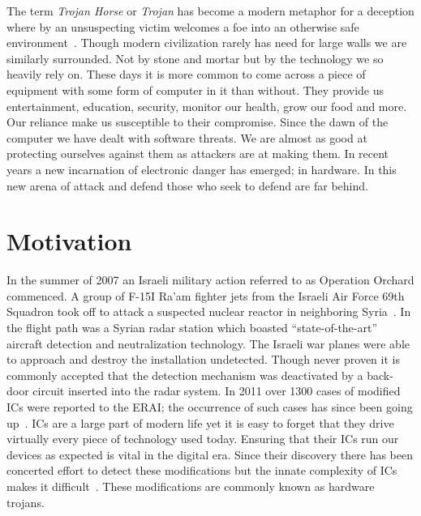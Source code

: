 \label{chapter:introduction}
The term \textit{Trojan Horse} or \textit{Trojan} has become a modern metaphor for a deception where by an unsuspecting victim welcomes a foe into an otherwise safe environment~\cite{searchForTrojanWar}.
Though modern civilization rarely has need for large walls we are similarly surrounded.
Not by stone and mortar but by the technology we so heavily rely on.
These days it is more common to come across a piece of equipment with some form of computer in it than without.
They provide us entertainment, education, security, monitor our health, grow our food and more.
Our reliance make us susceptible to their compromise.
Since the dawn of the computer we have dealt with software threats.
We are almost as good at protecting ourselves against them as attackers are at making them.
In recent years a new incarnation of electronic danger has emerged; in hardware.
In this new arena of attack and defend those who seek to defend are far behind.

\section{Motivation}
In the summer of 2007 an Israeli military action referred to as Operation Orchard commenced.
A group of F-15I Ra'am fighter jets from the Israeli Air Force 69th Squadron took off to attack a suspected nuclear reactor in neighboring Syria~\cite{stoppingHTsIEEESpectrum}.
In the flight path was a Syrian radar station which boasted ``state-of-the-art'' aircraft detection and neutralization technology. 
The Israeli war planes were able to approach and destroy the installation undetected.
Though never proven it is commonly accepted that the detection mechanism was deactivated by a back-door circuit inserted into the radar system.
In 2011 over 1300 cases of modified \acrshort{IC}s were reported to the \acrfull{ERAI}; the occurrence of such cases has since been going up~\cite{counterfeitIEEESpectrum}.
\acrfull{ICs} are a large part of modern life yet it is easy to forget that they drive virtually every piece of technology used today.
Ensuring that their \acrshort{IC}s run our devices as expected is vital in the digital era.
Since their discovery there has been concerted effort to detect these modifications but the innate complexity of \acrshort{IC}s makes it difficult~\cite{hardwareTrojanSurvey2015}.
These modifications are commonly known as hardware trojans.

